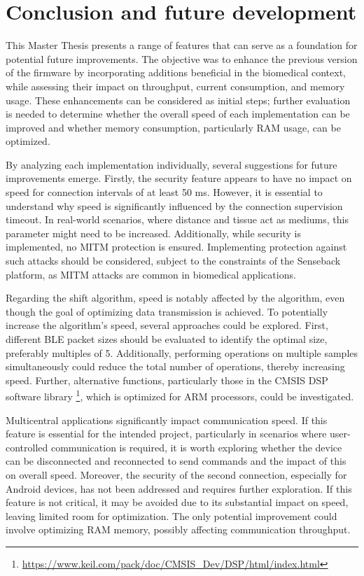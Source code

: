 \documentclass{Configuration_Files/PoliMi3i_thesis}
\begin{document}
\chapter{Conclusion and future development}

This Master Thesis presents a range of features that can serve as a foundation for potential future improvements. The objective was to enhance the previous version of the firmware by incorporating additions beneficial in the biomedical context, while assessing their impact on throughput, current consumption, and memory usage. These enhancements can be considered as initial steps; further evaluation is needed to determine whether the overall speed of each implementation can be improved and whether memory consumption, particularly RAM usage, can be optimized.

By analyzing each implementation individually, several suggestions for future improvements emerge. Firstly, the security feature appears to have no impact on speed for connection intervals of at least 50 ms. However, it is essential to understand why speed is significantly influenced by the connection supervision timeout. In real-world scenarios, where distance and tissue act as mediums, this parameter might need to be increased. Additionally, while security is implemented, no MITM protection is ensured. Implementing protection against such attacks should be considered, subject to the constraints of the Senseback platform, as MITM attacks are common in biomedical applications.

Regarding the shift algorithm, speed is notably affected by the algorithm, even though the goal of optimizing data transmission is achieved. To potentially increase the algorithm's speed, several approaches could be explored. First, different BLE packet sizes should be evaluated to identify the optimal size, preferably multiples of 5. Additionally, performing operations on multiple samples simultaneously could reduce the total number of operations, thereby increasing speed. Further, alternative functions, particularly those in the CMSIS DSP software library \footnote{\url{https://www.keil.com/pack/doc/CMSIS_Dev/DSP/html/index.html}}, which is optimized for ARM processors, could be investigated.

Multicentral applications significantly impact communication speed. If this feature is essential for the intended project, particularly in scenarios where user-controlled communication is required, it is worth exploring whether the device can be disconnected and reconnected to send commands and the impact of this on overall speed. Moreover, the security of the second connection, especially for Android devices, has not been addressed and requires further exploration. If this feature is not critical, it may be avoided due to its substantial impact on speed, leaving limited room for optimization. The only potential improvement could involve optimizing RAM memory, possibly affecting communication throughput.
\end{document}
